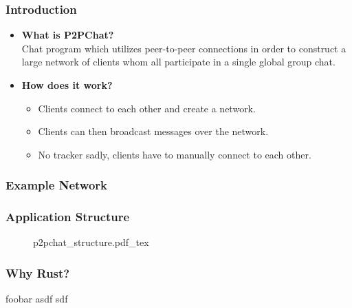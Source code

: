 \begin{frame}
  \frametitle{Introduction}
  \begin{itemize}
    \item \textbf{What is P2PChat?}\\
      Chat program which utilizes peer-to-peer connections in order to construct a large network of clients whom all participate in a single global group chat.
    \item \textbf{How does it work?}
      \begin{itemize}
        \item Clients connect to each other and create a network.
        \item Clients can then broadcast messages over the network.
        \item No tracker sadly, clients have to manually connect to each other.
      \end{itemize}
  \end{itemize}
\end{frame}

\begin{frame}
  \frametitle{Example Network}
\end{frame}

\begin{frame}
  \frametitle{Application Structure}
  \begin{figure}
    \def\svgwidth{\textwidth}
    {p2pchat_structure.pdf_tex}
  \end{figure}
\end{frame}

\begin{frame}
  \frametitle{Why Rust?}
  foobar asdf sdf

\end{frame}

